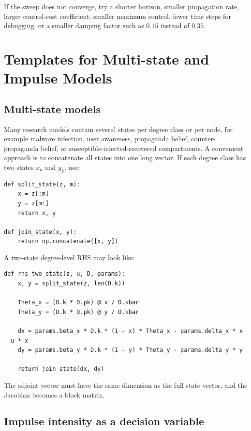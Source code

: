 \documentclass[11pt,a4paper]{article}
\begin{document}
If the sweep does not converge, try a shorter horizon, smaller propagation rate, larger control-cost coefficient, smaller maximum control, fewer time steps for debugging, or a smaller damping factor such as \(0.15\) instead of \(0.35\).

\section{Templates for Multi-state and Impulse Models}

\subsection{Multi-state models}

Many research models contain several states per degree class or per node, for example malware infection, user awareness, propaganda belief, counter-propaganda belief, or susceptible-infected-recovered compartments. A convenient approach is to concatenate all states into one long vector. If each degree class has two states \(x_k\) and \(y_k\), use:

\begin{lstlisting}[style=py]
def split_state(z, m):
    x = z[:m]
    y = z[m:]
    return x, y

def join_state(x, y):
    return np.concatenate([x, y])
\end{lstlisting}

A two-state degree-level RHS may look like:

\begin{lstlisting}[style=py]
def rhs_two_state(z, u, D, params):
    x, y = split_state(z, len(D.k))

    Theta_x = (D.k * D.pk) @ x / D.kbar
    Theta_y = (D.k * D.pk) @ y / D.kbar

    dx = params.beta_x * D.k * (1 - x) * Theta_x - params.delta_x * x - u * x
    dy = params.beta_y * D.k * (1 - y) * Theta_y - params.delta_y * y

    return join_state(dx, dy)
\end{lstlisting}

The adjoint vector must have the same dimension as the full state vector, and the Jacobian becomes a block matrix.

\subsection{Impulse intensity as a decision variable}
\end{document}
